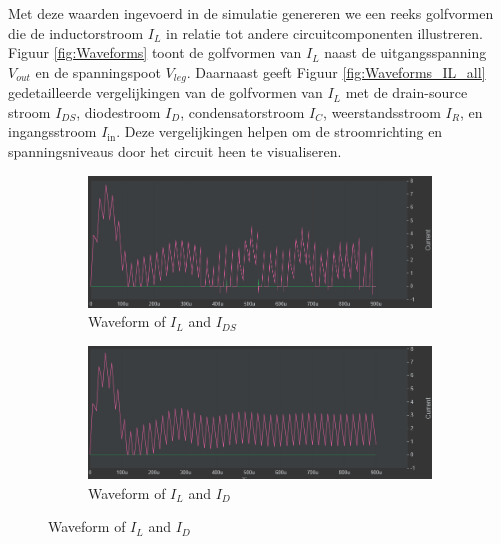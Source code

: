 Met deze waarden ingevoerd in de simulatie genereren we een reeks golfvormen die de inductorstroom \( I_L \) in relatie tot andere circuitcomponenten illustreren. Figuur \ref{fig:Waveforms} toont de golfvormen van \( I_L \) naast de uitgangsspanning \( V_{out} \) en de spanningspoot \( V_{leg} \). Daarnaast geeft Figuur \ref{fig:Waveforms_IL_all} gedetailleerde vergelijkingen van de golfvormen van \( I_L \) met de drain-source stroom \( I_{DS} \), diodestroom \( I_{D} \), condensatorstroom \( I_{C} \), weerstandsstroom \( I_{R} \), en ingangsstroom \( I_{\text{in}} \). Deze vergelijkingen helpen om de stroomrichting en spanningsniveaus door het circuit heen te visualiseren.

\begin{figure}[h!]
    \centering
    \begin{subfigure}[b]{0.45\linewidth}
        \centering
        \includegraphics[width=\linewidth]{img/hfd2/IL-IDS.png}
        \caption{Waveform of \(I_{L}\) and \(I_{DS}\)}
        \label{fig:Waveform_IL_IDS}
    \end{subfigure}
    \hfill
    \begin{subfigure}[b]{0.45\linewidth}
        \centering
        \includegraphics[width=\linewidth]{img/hfd2/IL-ID.png}
        \caption{Waveform of \(I_{L}\) and \(I_{D}\)}
        \label{fig:Waveform_IL_ID}
    \end{subfigure}
    

\end{figure}
